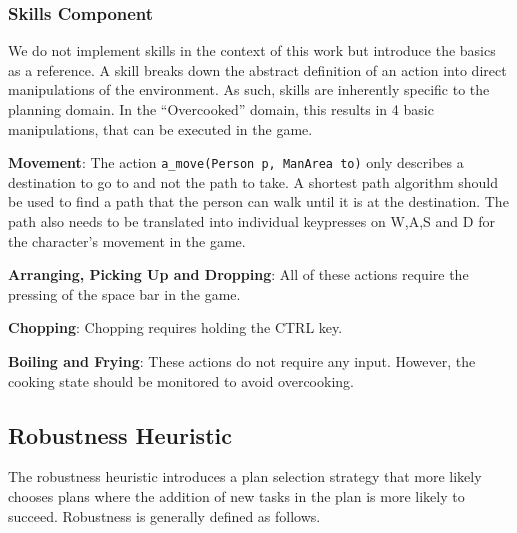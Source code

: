 \subsubsection{Skills Component}

We do not implement skills in the context of this work but introduce the basics as a reference.
A skill breaks down the abstract definition of an action into direct manipulations of the environment.
As such, skills are inherently specific to the planning domain.
In the ``Overcooked'' domain, this results in 4 basic manipulations, that can be executed in the game.

\textbf{Movement}: The action \verb|a_move(Person p, ManArea to)| only describes a destination to go to and not the path to take. 
A shortest path algorithm should be used to find a path that the person can walk until it is at the destination. 
The path also needs to be translated into individual keypresses on W,A,S and D for the character's movement in the game.

\textbf{Arranging, Picking Up and Dropping}: All of these actions require the pressing of the space bar in the game.

\textbf{Chopping}: Chopping requires holding the CTRL key.

\textbf{Boiling and Frying}: These actions do not require any input. 
However, the cooking state should be monitored to avoid overcooking.





\subsection{Robustness Heuristic}
\label{sec:approach-robustness}

The robustness heuristic introduces a plan selection strategy that more likely chooses plans where the addition of new tasks in the plan is more likely to succeed.
Robustness is generally defined as follows.

